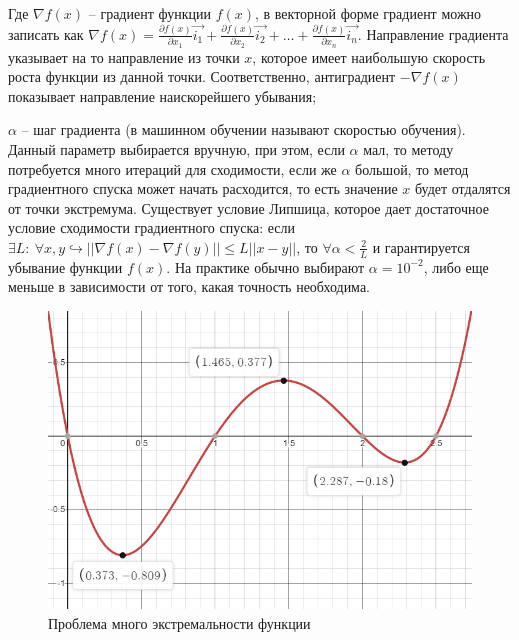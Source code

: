 Где $\nabla f(x)$ -- градиент функции $f(x)$, в векторной форме градиент можно записать как $\nabla f(x) = \frac{\partial f(x)}{\partial x_1} \vec{i_1} + \frac{\partial f(x)}{\partial x_2} \vec{i_2} + \dots + \frac{\partial f(x)}{\partial x_n} \vec{i_n}$. Направление градиента указывает на то направление из точки $x$, которое имеет наибольшую скорость роста функции из данной точки. Соответственно, антиградиент $-\nabla f(x)$ показывает направление наискорейшего убывания;

$\alpha$ -- шаг градиента (в машинном обучении называют скоростью обучения). Данный параметр выбирается вручную, при этом, если $\alpha$ мал, то методу потребуется много итераций для сходимости, если же $\alpha$ большой, то метод градиентного спуска может начать расходится, то есть значение $x$ будет отдалятся от точки экстремума. Существует условие Липшица, которое дает достаточное условие сходимости градиентного спуска: если $\exists L:~\forall x, y \hookrightarrow || \nabla f(x) - \nabla f(y) || \leq L || x - y ||$, то $\forall \alpha < \frac{2}{L}$ и гарантируется убывание функции $f(x)$. На практике обычно выбирают $\alpha=10^{-2}$, либо еще меньше в зависимости от того, какая точность необходима.

\begin{figure} 
    \vspace{-3ex}
    \includegraphics[width=\linewidth]{src/img/multi_extreme.png}
    \caption{Проблема много экстремальности функции}
    \label{fig:multi_extreme}
\end{figure}

